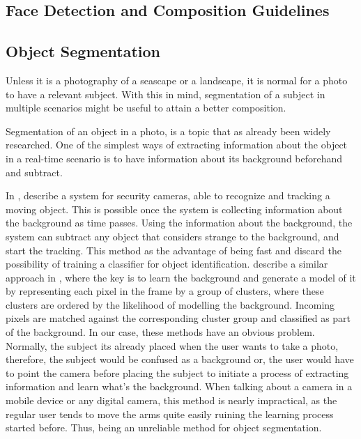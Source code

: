 \subsection{Face Detection and Composition Guidelines}
\label{sub:face_guidelines}

\subsection{Object Segmentation}
\label{sub:segmentation}

Unless it is a photography of a seascape or a landscape, it is normal for a photo to have a relevant subject. With this in mind, segmentation of a subject in multiple scenarios might be useful to attain a better composition.

Segmentation of an object in a photo, is a topic that as already been widely researched. One of the simplest ways of extracting information about the object in a real-time scenario is to have information about its background beforehand and subtract. 

In \cite{yang2004real}, \citeauthor{yang2004real} describe a system for security cameras, able to recognize and tracking a moving object. This is possible once the system is collecting information about the background as time passes. Using the information about the background, the system can subtract any object that considers strange to the background, and start the tracking. This method as the advantage of being fast and discard the possibility of training a classifier for object identification. 
\citeauthor{butler2003real} describe a similar approach in \cite{butler2003real}, where the key is to learn the background and generate a model of it by representing each pixel in the frame by a group of clusters, where these clusters are ordered by the likelihood of modelling the background. Incoming pixels are matched against the corresponding cluster group and classified as part of the background.
In our case, these methods have an obvious problem. Normally, the subject its already placed when the user wants to take a photo, therefore, the subject would be confused as a background or, the user would have to point the camera before placing the subject to initiate a process of extracting information and learn what's the background. When talking about a  camera in a mobile device or any digital camera, this method is nearly impractical, as the regular user tends to move the arms quite easily ruining the learning process started before. Thus, being an unreliable method for object segmentation.


